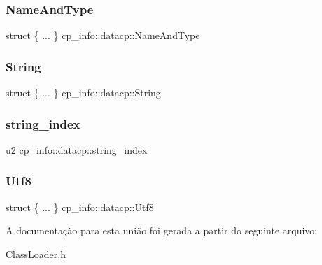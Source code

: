\subsubsection{\texorpdfstring{Name\+And\+Type}{NameAndType}}
{\footnotesize\ttfamily struct \{ ... \}  cp\+\_\+info\+::datacp\+::\+Name\+And\+Type}

\mbox{\label{unioncp__info_1_1datacp_adbed25f7609825c7bfb2d5e5df502498}} 
\subsubsection{\texorpdfstring{String}{String}}
{\footnotesize\ttfamily struct \{ ... \}  cp\+\_\+info\+::datacp\+::\+String}

\mbox{\label{unioncp__info_1_1datacp_af0c3e4590189a854d4c52d70464571cf}} 
\subsubsection{\texorpdfstring{string\+\_\+index}{string\_index}}
{\footnotesize\ttfamily \hyperlink{ClassLoader_8h_a5f223212eef04d10a4550ded680cb1cf}{u2} cp\+\_\+info\+::datacp\+::string\+\_\+index}

\mbox{\label{unioncp__info_1_1datacp_ad1597573ef20c04564d00878897378be}} 
\subsubsection{\texorpdfstring{Utf8}{Utf8}}
{\footnotesize\ttfamily struct \{ ... \}  cp\+\_\+info\+::datacp\+::\+Utf8}



A documentação para esta união foi gerada a partir do seguinte arquivo\+:\begin{DoxyCompactItemize}
\item 
\hyperlink{ClassLoader_8h}{Class\+Loader.\+h}\end{DoxyCompactItemize}
